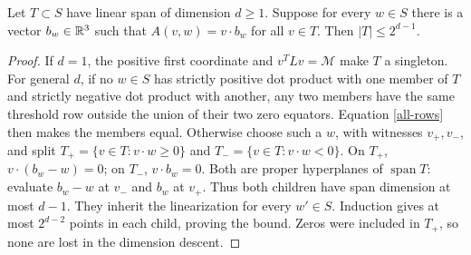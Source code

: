 \begin{lemma}\label{descent}
Let $T\subset S$ have linear span of dimension $d\ge1$.
Suppose for every $w\in S$ there is a vector $b_w\in\mathbb R^3$ such that
$A(v,w)=v\cdot b_w$ for all $v\in T$. Then $|T|\le2^{d-1}$.
\end{lemma}
\begin{proof}
If $d=1$, the positive first coordinate and $v^TLv=\mathcal M$ make $T$ a singleton.
For general $d$, if no $w\in S$ has strictly positive dot product with one member
of $T$ and strictly negative dot product with another, any two members have the
same threshold row outside the union of their two zero equators.
Equation \eqref{all-rows} then makes the members equal.
Otherwise choose such a $w$, with witnesses $v_+,v_-$, and split
$T_+=\{v\in T:v\cdot w\ge0\}$ and $T_-=\{v\in T:v\cdot w<0\}$.
On $T_+$, $v\cdot(b_w-w)=0$; on $T_-$, $v\cdot b_w=0$.
Both are proper hyperplanes of $\operatorname{span}T$: evaluate $b_w-w$ at $v_-$
and $b_w$ at $v_+$. Thus both children have span dimension at most $d-1$.
They inherit the linearization for every $w'\in S$.
Induction gives at most $2^{d-2}$ points in each child, proving the bound.
Zeros were included in $T_+$, so none are lost in the dimension descent.
\end{proof}

